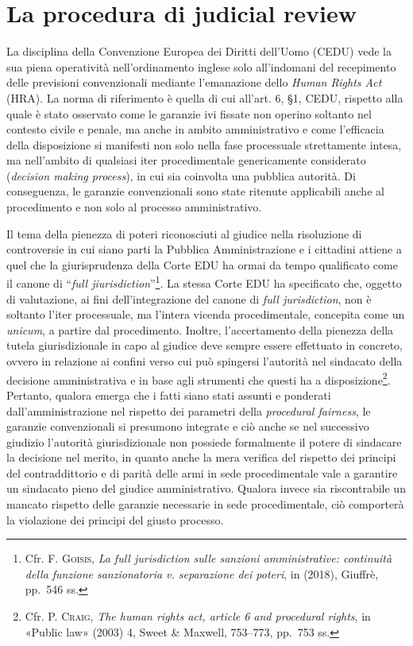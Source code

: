 \documentclass[12pt,it,a4paper,]{report}
\begin{document}
\hypertarget{la-procedura-di-judicial-review}{%
\section{La procedura di judicial
review}\label{la-procedura-di-judicial-review}}

La disciplina della Convenzione Europea dei Diritti dell'Uomo (CEDU)
vede la sua piena operatività nell'ordinamento inglese solo all'indomani
del recepimento delle previsioni convenzionali mediante l'emanazione
dello \emph{Human Rights Act} (HRA). La norma di riferimento è quella di
cui all'art. 6, §1, CEDU, rispetto alla quale è stato osservato come le
garanzie ivi fissate non operino soltanto nel contesto civile e penale,
ma anche in ambito amministrativo e come l'efficacia della disposizione
si manifesti non solo nella fase processuale strettamente intesa, ma
nell'ambito di qualsiasi iter procedimentale genericamente considerato
(\emph{decision making process}), in cui sia coinvolta una pubblica
autorità. Di conseguenza, le garanzie convenzionali sono state ritenute
applicabili anche al procedimento e non solo al processo amministrativo.

Il tema della pienezza di poteri riconosciuti al giudice nella
risoluzione di controversie in cui siano parti la Pubblica
Amministrazione e i cittadini attiene a quel che la giurisprudenza della
Corte EDU ha ormai da tempo qualificato come il canone di ``\emph{full
jiurisdiction}''\footnote{Cfr. F. \textsc{Goisis}, \emph{La full
  jurisdiction sulle sanzioni amministrative: continuità della funzione
  sanzionatoria v. separazione dei poteri}, in (2018), Giuffrè, pp.~546
  ss.}. La stessa Corte EDU ha specificato che, oggetto di valutazione,
ai fini dell'integrazione del canone di \emph{full jurisdiction}, non è
soltanto l'iter processuale, ma l'intera vicenda procedimentale,
concepita come un \emph{unicum}, a partire dal procedimento. Inoltre,
l'accertamento della pienezza della tutela giurisdizionale in capo al
giudice deve sempre essere effettuato in concreto, ovvero in relazione
ai confini verso cui può spingersi l'autorità nel sindacato della
decisione amministrativa e in base agli strumenti che questi ha a
disposizione\footnote{Cfr. P. \textsc{Craig}, \emph{The human rights
  act, article 6 and procedural rights}, in {«Public law»} (2003) 4,
  Sweet \& Maxwell, 753--773, pp.~753 ss.}. Pertanto, qualora emerga che
i fatti siano stati assunti e ponderati dall'amministrazione nel
rispetto dei parametri della \emph{procedural fairness}, le garanzie
convenzionali si presumono integrate e ciò anche se nel successivo
giudizio l'autorità giurisdizionale non possiede formalmente il potere
di sindacare la decisione nel merito, in quanto anche la mera verifica
del rispetto dei principi del contraddittorio e di parità delle armi in
sede procedimentale vale a garantire un sindacato pieno del giudice
amministrativo. Qualora invece sia riscontrabile un mancato rispetto
delle garanzie necessarie in sede procedimentale, ciò comporterà la
violazione dei principi del giusto processo.
\end{document}
